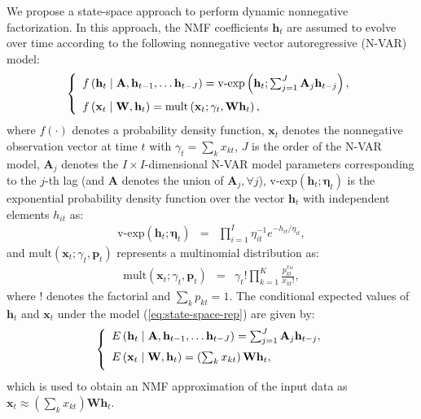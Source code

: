 \documentclass[10pt,twocolumn,twoside] {IEEEtran}
\begin{document}
We propose a state-space approach to perform dynamic nonnegative factorization.
In this approach, the NMF coefficients $\mathbf{h}_t$ are assumed to evolve over
time according to the following nonnegative vector autoregressive (N-VAR) model:
\begin{multline}
\left\{ \begin{array}{ll}
f\left(\mathbf{h}_{t}\mid\mathbf{A},\mathbf{h}_{t-1},\ldots\mathbf{h}_{t-J}\right)=\text{v-exp}\left(\mathbf{h}_{t};\sum_{j=1}^{J}\mathbf{A}_{j}\mathbf{h}_{t-j}\right) \vspace{2mm} ,\\
f\left(\mathbf{x}_{t}\mid\mathbf{W},\mathbf{h}_{t}\right)=\text{mult}\left(\mathbf{x}_{t};\gamma_{t},\mathbf{W}\mathbf{h}_{t}\right),
\end{array}\right.\label{eq:state-space-rep}
\end{multline}
 where $f(\cdot)$ denotes a probability density function, $\mathbf{x}_{t}$ denotes the nonnegative observation vector at time $t$ with $\gamma_{t}=\sum_{k}x_{kt}$, $J$ is the order of the N-VAR model, $\mathbf{A}_j$ denotes the $I\times I$-dimensional N-VAR model parameters corresponding to the $j$-th lag (and $\mathbf{A}$ denotes the union of $\mathbf{A}_j,\forall j$), $\text{v-exp}\left(\mathbf{h}_{t};\boldsymbol{\eta}_{t}\right)$
is the exponential probability density function over the vector $\mathbf{h}_{t}$
with independent elements $h_{it}$ as:
\begin{eqnarray}
\text{v-exp}\left(\mathbf{h}_{t};\boldsymbol{\eta}_{t}\right) & = & \prod_{i=1}^{I}\eta_{it}^{-1}e^{-h_{it}/\eta_{it}},\label{eq:exp_prior}
\end{eqnarray}
and $\text{mult}\left(\mathbf{x}_{t};\gamma_{t},\mathbf{p}_{t}\right)$
represents a multinomial distribution as:
\begin{eqnarray}
\text{mult}\left(\mathbf{x}_{t};\gamma_{t},\mathbf{p}_{t}\right) & = & \gamma_t!\prod_{k=1}^{K}\frac{p_{kt}^{x_{kt}}}{x_{kt}!},\label{eq:mult_dist}
\end{eqnarray}
where $!$ denotes the factorial and $\sum_{k}p_{kt}=1$. The conditional expected values of $\mathbf{h}_{t}$ and $\mathbf{x}_{t}$ under the model (\ref{eq:state-space-rep}) are given by:
\begin{multline}
\left\{ \begin{array}{ll}
E\left(\mathbf{h}_{t}\mid\mathbf{A},\mathbf{h}_{t-1},\ldots\mathbf{h}_{t-J}\right)=\sum_{j=1}^{J}\mathbf{A}_{j}\mathbf{h}_{t-j} \vspace{2mm} ,\\
E\left(\mathbf{x}_{t}\mid\mathbf{W},\mathbf{h}_{t}\right)=\left( \sum_{k}x_{kt} \right)\mathbf{W}\mathbf{h}_{t} \vspace{2mm},
\end{array}\right.\label{eq:expected_values}
\end{multline}
which is used to obtain an NMF approximation of the input data as $\mathbf{x}_{t}\approx (\sum_{k}x_{kt})\mathbf{W}\mathbf{h}_{t}$.
\end{document}
